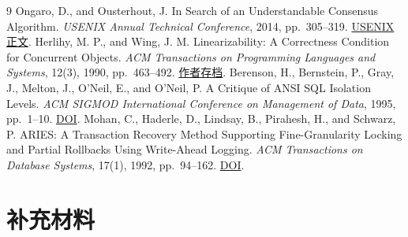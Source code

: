 \documentclass[UTF8,a4paper,12pt]{ctexart}
\begin{document}
\pagestyle{empty}

\clearpage
\ifReportIntegrity
  
  \clearpage
\fi
\ifReportAbstractZH
  
  \clearpage
\fi
\ifReportAbstractEN
  
  \clearpage
\fi

\pagestyle{fancy}
\tableofcontents
\clearpage






\clearpage
{}
{}
\renewcommand{\refname}{参考文献}
\begin{thebibliography}{9}
Ongaro, D., and Ousterhout, J.
In Search of an Understandable Consensus Algorithm.
\emph{USENIX Annual Technical Conference}, 2014, pp.~305--319.
\href{https://www.usenix.org/system/files/conference/atc14/atc14-paper-ongaro.pdf}{USENIX 正文}.
Herlihy, M. P., and Wing, J. M.
Linearizability: A Correctness Condition for Concurrent Objects.
\emph{ACM Transactions on Programming Languages and Systems}, 12(3), 1990, pp.~463--492.
\href{https://www.cs.cmu.edu/~wing/publications/HerlihyWing90.pdf}{作者存档}.
Berenson, H., Bernstein, P., Gray, J., Melton, J., O'Neil, E., and O'Neil, P.
A Critique of ANSI SQL Isolation Levels.
\emph{ACM SIGMOD International Conference on Management of Data}, 1995, pp.~1--10.
\href{https://doi.org/10.1145/223784.223785}{DOI}.
Mohan, C., Haderle, D., Lindsay, B., Pirahesh, H., and Schwarz, P.
ARIES: A Transaction Recovery Method Supporting Fine-Granularity Locking and Partial Rollbacks Using Write-Ahead Logging.
\emph{ACM Transactions on Database Systems}, 17(1), 1992, pp.~94--162.
\href{https://doi.org/10.1145/128765.128770}{DOI}.
\end{thebibliography}
\clearpage
\appendix
\section{补充材料}

\end{document}
